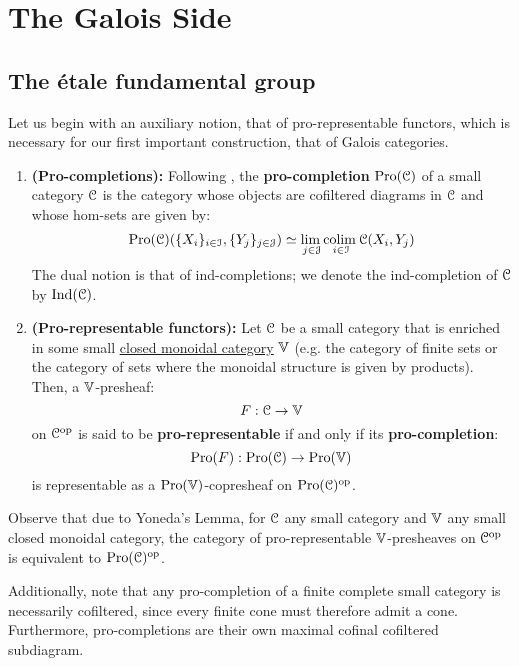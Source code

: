 \section{The Galois Side}
    \subsection{The \'etale fundamental group}
        Let us begin with an auxiliary notion, that of pro-representable functors, which is necessary for our first important construction, that of Galois categories.
        \begin{definition} \label{def: pro_representable_functors}
            \noindent
            \begin{enumerate}
                \item \textbf{(Pro-completions):} Following \cite[Definition 2.1]{isaksen_2001_limits_and_colimits_in_pro_categories}, the \textbf{pro-completion} $\mathrm{Pro}(\mathcal{C})$ of a small category $\mathcal{C}$ is the category whose objects are cofiltered diagrams in $\mathcal{C}$ and whose hom-sets are given by:
                    $$\mathrm{Pro}(\mathcal{C})(\{X_i\}_{i \in \mathcal{I}}, \{Y_j\}_{j \in \mathcal{J}}) \simeq \underset{j \in \mathcal{J}}{\operatorname{lim} \:} \underset{i \in \mathcal{I}}{\operatorname{colim} \:} \mathcal{C}(X_i, Y_j)$$
                The dual notion is that of ind-completions; we denote the ind-completion of $\mathcal{C}$ by $\mathrm{Ind}(\mathcal{C})$.
                \item \textbf{(Pro-representable functors):} Let $\mathcal{C}$ be a small category that is enriched in some small \href{http://nlab-pages.s3.us-east-2.amazonaws.com/nlab/show/closed+monoidal+category}{\underline{closed monoidal category}} $\mathbb{V}$ (e.g. the category of finite sets or the category of sets where the monoidal structure is given by products). Then, a $\mathbb{V}$-presheaf:
                    $$F: \mathcal{C} \to \mathbb{V}$$
                on $\mathcal{C}^{\mathrm{op}}$ is said to be \textbf{pro-representable} if and only if its \textbf{pro-completion}:
                    $$\mathrm{Pro}(F): \mathrm{Pro}(\mathcal{C}) \to \mathrm{Pro}(\mathbb{V})$$
                is representable as a $\mathrm{Pro}(\mathbb{V})$-copresheaf on $\mathrm{Pro}(\mathcal{C})^{\mathrm{op}}$.
            \end{enumerate}
        \end{definition}
        \begin{remark} \label{remark: pro_representable_functors_are_ind_objects}
            Observe that due to Yoneda's Lemma, for $\mathcal{C}$ any small category and $\mathbb{V}$ any small closed monoidal category, the category of pro-representable $\mathbb{V}$-presheaves on $\mathcal{C}^{\mathrm{op}}$ is equivalent to $\mathrm{Pro}(\mathcal{C})^{\mathrm{op}}$.
            
            Additionally, note that any pro-completion of a finite complete small category is necessarily cofiltered, since every finite cone must therefore admit a cone. Furthermore, pro-completions are their own maximal cofinal cofiltered subdiagram.
        \end{remark}
        
